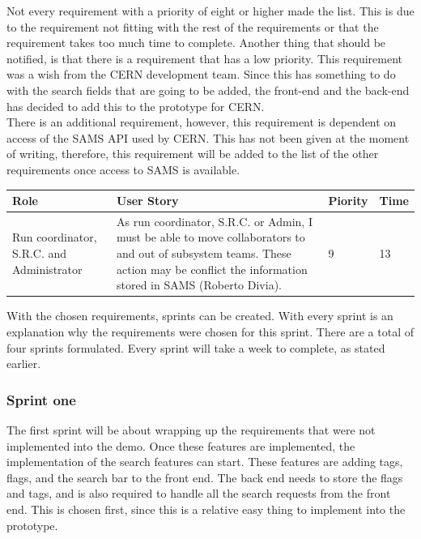 \documentclass[paper=a4, fontsize=11pt,twoside]{scrartcl}	%
\begin{document}
Not every requirement with a priority of eight or higher made the list. This is due to the requirement not fitting with the rest of the requirements or that the requirement takes too much time to complete. Another thing that should be notified, is that there is a requirement that has a low priority. This requirement was a wish from the CERN development team. Since this has something to do with the search fields that are going to be added, the front-end and the back-end has decided to add this to the prototype for CERN.   \\

There is an additional requirement, however, this requirement is dependent on access of the SAMS API used by CERN. This has not been given at the moment of writing, therefore, this requirement will be added to the list of the other requirements once access to SAMS is available. \\

\begin{longtable}{ | p{3cm} | p{8cm} | p{1cm} | l |}
\hline
Role & User Story & Piority & Time \\ \hline
Run coordinator, S.R.C. and Administrator &  As run coordinator, S.R.C. or Admin, I must be able to move collaborators to and out of subsystem teams. These action may be conflict the information stored in SAMS (Roberto Divia). & 9 & 13 \\ \hline
\end{longtable}

With the chosen requirements, sprints can be created. With every sprint is an explanation why the requirements were chosen for this sprint. There are a total of four sprints formulated. Every sprint will take a week to complete, as stated earlier.

\subsubsection{Sprint one}
The first sprint will be about wrapping up the requirements that were not implemented into the demo. Once these features are implemented, the implementation of the search features can start. These features are adding tags, flags, and the search bar to the front end. The back end needs to store the flags and tags, and is also required to handle all the search requests from the front end. This is chosen first, since this is a relative easy thing to implement into the prototype.
\end{document}

